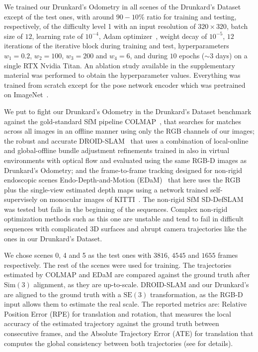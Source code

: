 \documentclass{article}
\newcommand{\boldparagraph}[1]{\vspace{0.0em}\noindent{\bf #1}}
\begin{document}
\boldparagraph{Drunkard's Setup.}
We trained our Drunkard's Odometry in all scenes of the Drunkard's Dataset except of the test ones, with around $90-10\%$ ratio for training and testing, respectively, of the difficulty level 1 with an input resolution of $320 \times 320$, batch size of $12$, learning rate of $10^{-4}$, Adam optimizer~\cite{loshchilov2017decoupled}, weight decay of $10^{-5}$, $12$ iterations of the iterative block during training and test, hyperparameters $w_1 = 0.2$, $w_2 = 100$, $w_3 = 200$ and $w_4 = 6$, and during $10$ epochs ($\sim3$ days) on a single RTX Nvidia Titan. An ablation study available in the supplementary material was performed to obtain the hyperparameter values. Everything was trained from scratch except for the pose network encoder which was pretrained on ImageNet~\cite{deng2009imagenet}. 


\boldparagraph{Drunkard's Benchmark.}
We put to fight our Drunkard's Odometry in the Drunkard's Dataset benchmark against the gold-standard SfM pipeline COLMAP~\cite{schoenberger2016sfm, schoenberger2016mvs}, that searches for matches across all images in an offline manner using only the RGB channels of our images; the robust and accurate DROID-SLAM~\cite{teed2021droid} that uses a combination of local-online and global-offline bundle adjustment refinements trained in also in virtual environments with optical flow and evaluated using the same RGB-D images as Drunkard's Odometry; and the frame-to-frame tracking designed for non-rigid endoscopic scenes Endo-Depth-and-Motion (EDaM)~\cite{recasens2021endo} that here uses the RGB plus the single-view estimated depth maps using a network trained self-supervisely on monocular images of KITTI~\cite{geiger2013vision}. The non-rigid SfM SD-DefSLAM~\cite{gomez2021sd} was tested but fails in the beginning of the sequences. Complex non-rigid optimization methods such as this one are unstable and tend to fail in difficult sequences with complicated 3D surfaces and abrupt camera trajectories like the ones in our Drunkard's Dataset.

We chose scenes 0, 4 and 5 as the test ones with $3816$, $4545$ and $1655$ frames respectively. The rest of the scenes were used for training. The trajectories estimated by COLMAP and EDaM are compared against the ground truth after $\ensuremath{\mathrm{Sim}(3)}$ alignment, as they are up-to-scale. DROID-SLAM and our Drunkard's are aligned to the ground truth with a $\ensuremath{\mathrm{SE}(3)}$ transformation, as the RGB-D input allows them to estimate the real scale. The reported metrics are: Relative Position Error (RPE) for translation and rotation, that measures the local accuracy of the estimated trajectory against the ground truth between consecutive frames, and the Absolute Trajectory Error (ATE) for translation that computes the global consistency between both trajectories (see \cite{prokhorov2019measuring} for details).
\end{document}
